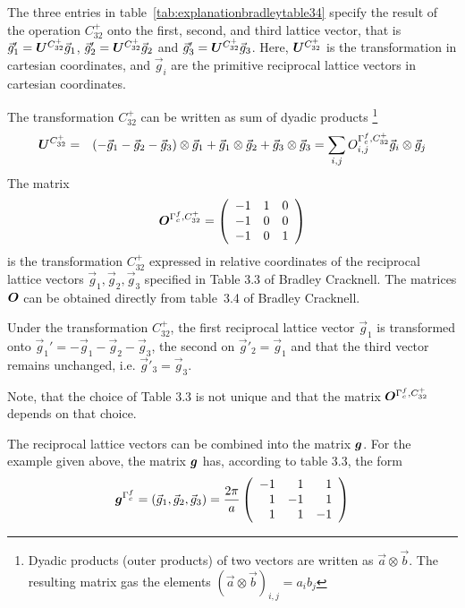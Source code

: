 \documentclass[11pt,a4paper]{report}
\begin{document}
The three entries in table~\ref{tab:explanationbradleytable34} specify
the result of the operation $C^+_{32}$ onto the first, second, and
third lattice vector, that is
$\vec{g}'_1=\bm{U}^{C^+_{32}}\vec{g}_1$,
$\vec{g}'_2=\bm{U}^{C^+_{32}}\vec{g}_2$ and
$\vec{g}'_3=\bm{U}^{C^+_{32}}\vec{g}_3$. Here, $\bm{U}^{C^+_{32}}$
is the transformation in cartesian coordinates, and $\vec{g}_i$ are
the primitive reciprocal lattice vectors in cartesian coordinates.


The transformation $C^+_{32}$ can be written as sum of dyadic products
\footnote{Dyadic products (outer products) of two vectors are written
  as $\vec{a}\otimes\vec{b}$. The resulting matrix gas the elements
  $(\vec{a}\otimes\vec{b})_{i,j}=a_ib_j$}
\begin{eqnarray}
\bm{U}^{C^+_{32}}&=&
(-\vec{g}_1-\vec{g}_2-\vec{g}_3)\otimes\vec{g}_1
+\vec{g}_1\otimes\vec{g}_2
+\vec{g}_3\otimes\vec{g}_3
=\sum_{i,j}O^{\Gamma^f_c,C^+_{32}}_{i,j}  \vec{g}_i\otimes\vec{g}_j
\end{eqnarray}
The matrix 
\begin{eqnarray}
\bm{O}^{\Gamma^f_c,C^+_{32}} =
\left(\begin{array}{ccc}
-1 & 1 & 0 \\
-1 & 0 & 0 \\
-1 & 0 & 1\\
\end{array}\right)
\end{eqnarray}
is the transformation $C^+_{32}$ expressed in relative coordinates of
the reciprocal lattice vectors $\vec{g}_1,\vec{g}_2,\vec{g}_3$
specified in Table 3.3 of Bradley Cracknell\cite{bradley72_book}.  The
matrices $\bm{O}$ can be obtained directly from table~3.4 of Bradley
Cracknell\cite{bradley72_book}. 

Under the transformation $C^+_{32}$, the first reciprocal lattice
vector $\vec{g}_1$ is transformed onto
$\vec{g}_1'=-\vec{g}_1-\vec{g}_2-\vec{g}_3$, the second on
$\vec{g}'_2=\vec{g}_1$ and that the third vector remains unchanged,
i.e. $\vec{g}'_3=\vec{g}_3$.

Note, that the choice of Table 3.3 is not unique and that the matrix
$\bm{O}^{\Gamma^f_c,C^+_{32}}$ depends on that choice.

The reciprocal lattice vectors can be combined into the matrix
$\bm{g}$. For the example given above, the matrix $\bm{g}$ has,
according to table 3.3, the form
\begin{eqnarray}
\bm{g}^{\Gamma^f_c}=(\vec{g}_1,\vec{g}_2,\vec{g}_3)=\frac{2\pi}{a}
\left(
\begin{array}{rrr}
-1 & 1& 1\\
 1 & -1& 1\\
 1 & 1& -1 \\
\end{array}\right)
\label{eq:matrixgforgfc}
\end{eqnarray}
\end{document}

